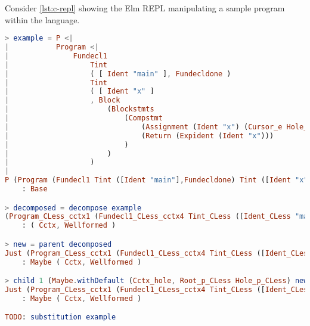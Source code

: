 \begin{lstlisting}[style=inline, caption={Generated functions for substitution for the C language}, label={lst:c-sub}]
\end{lstlisting}

Consider \cref{lst:c-repl} showing the Elm REPL manipulating a sample program within
the language.

\begin{lstlisting}[style=inline, language=elm, caption={Elm REPL demonstration of C language editor}, label={lst:c-repl}]
> example = P <|
|           Program <|
|               Fundecl1
|                   Tint
|                   ( [ Ident "main" ], Fundecldone )
|                   Tint
|                   ( [ Ident "x" ]
|                   , Block
|                       (Blockstmts
|                           (Compstmt
|                               (Assignment (Ident "x") (Cursor_e Hole_e))
|                               (Return (Expident (Ident "x")))
|                           )
|                       )
|                   )
|
P (Program (Fundecl1 Tint ([Ident "main"],Fundecldone) Tint ([Ident "x"],Block (Blockstmts (Compstmt (Assignment (Ident "x") (Cursor_e Hole_e)) (Return (Expident (Ident "x"))))))))
    : Base

> decomposed = decompose example
(Program_CLess_cctx1 (Fundecl1_CLess_cctx4 Tint_CLess ([Ident_CLess "main"],Fundecldone_CLess) Tint_CLess ([Ident_CLess "x"],Block_CLess_cctx1 (Blockstmts_CLess_cctx1 (Compstmt_CLess_cctx1 (Assignment_CLess_cctx2 (Ident_CLess "x") Cctx_hole) (Return_CLess (Expident_CLess (Ident_CLess "x"))))))),Root_e_CLess Hole_e_CLess)
    : ( Cctx, Wellformed )

> new = parent decomposed
Just (Program_CLess_cctx1 (Fundecl1_CLess_cctx4 Tint_CLess ([Ident_CLess "main"],Fundecldone_CLess) Tint_CLess ([Ident_CLess "x"],Block_CLess_cctx1 (Blockstmts_CLess_cctx1 (Compstmt_CLess_cctx1 Cctx_hole (Return_CLess (Expident_CLess (Ident_CLess "x"))))))),Root_s_CLess (Assignment_CLess (Ident_CLess "x") Hole_e_CLess))
    : Maybe ( Cctx, Wellformed )

> child 1 (Maybe.withDefault (Cctx_hole, Root_p_CLess Hole_p_CLess) new)
Just (Program_CLess_cctx1 (Fundecl1_CLess_cctx4 Tint_CLess ([Ident_CLess "main"],Fundecldone_CLess) Tint_CLess ([Ident_CLess "x"],Block_CLess_cctx1 (Blockstmts_CLess_cctx1 (Compstmt_CLess_cctx1 (Assignment_CLess_cctx1 Cctx_hole Hole_e_CLess) (Return_CLess (Expident_CLess (Ident_CLess "x"))))))),Root_id_CLess (Ident_CLess "x"))
    : Maybe ( Cctx, Wellformed )

TODO: substitution example
\end{lstlisting}

